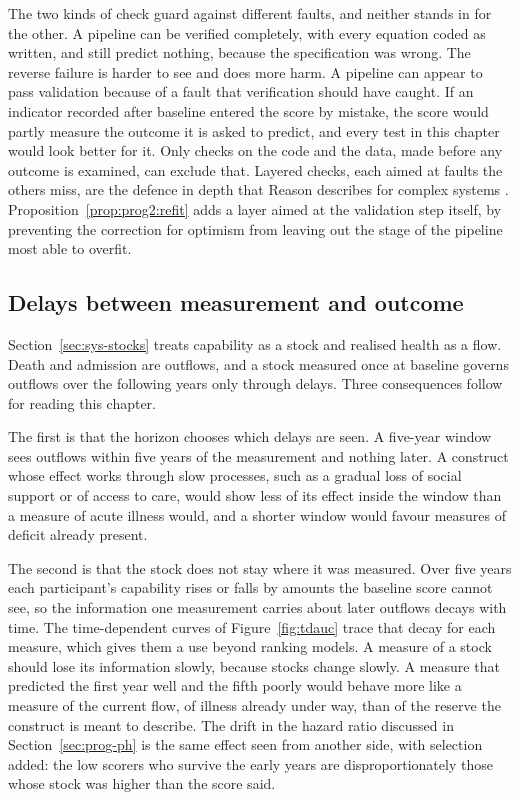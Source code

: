 The two kinds of check guard against different faults, and neither stands in for the other. A pipeline can be verified completely, with every equation coded as written, and still predict nothing, because the specification was wrong. The reverse failure is harder to see and does more harm. A pipeline can appear to pass validation because of a fault that verification should have caught. If an indicator recorded after baseline entered the score by mistake, the score would partly measure the outcome it is asked to predict, and every test in this chapter would look better for it. Only checks on the code and the data, made before any outcome is examined, can exclude that. Layered checks, each aimed at faults the others miss, are the defence in depth that Reason describes for complex systems \citep{reason_1990}. Proposition~\ref{prop:prog2:refit} adds a layer aimed at the validation step itself, by preventing the correction for optimism from leaving out the stage of the pipeline most able to overfit.

\subsection*{Delays between measurement and outcome}

Section~\ref{sec:sys-stocks} treats capability as a stock and realised health as a flow. Death and admission are outflows, and a stock measured once at baseline governs outflows over the following years only through delays. Three consequences follow for reading this chapter.

The first is that the horizon chooses which delays are seen. A five-year window sees outflows within five years of the measurement and nothing later. A construct whose effect works through slow processes, such as a gradual loss of social support or of access to care, would show less of its effect inside the window than a measure of acute illness would, and a shorter window would favour measures of deficit already present.

The second is that the stock does not stay where it was measured. Over five years each participant's capability rises or falls by amounts the baseline score cannot see, so the information one measurement carries about later outflows decays with time. The time-dependent curves of Figure~\ref{fig:tdauc} trace that decay for each measure, which gives them a use beyond ranking models. A measure of a stock should lose its information slowly, because stocks change slowly. A measure that predicted the first year well and the fifth poorly would behave more like a measure of the current flow, of illness already under way, than of the reserve the construct is meant to describe. The drift in the hazard ratio discussed in Section~\ref{sec:prog-ph} is the same effect seen from another side, with selection added: the low scorers who survive the early years are disproportionately those whose stock was higher than the score said.

